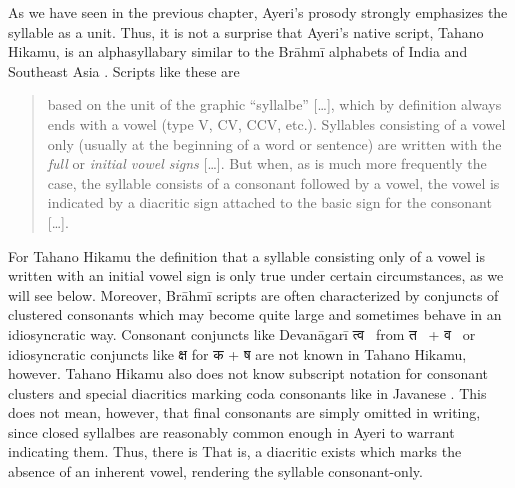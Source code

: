 As we have seen in the previous chapter, Ayeri's prosody strongly emphasizes 
the syllable as a unit. Thus, it is not a surprise that Ayeri's native script,
Tahano Hikamu, is an alphasyllabary similar to the Brāhmī alphabets of 
India and Southeast Asia \parencites{salomon1996}{court1996}. Scripts like these are 

\blockcquote[376]{salomon1996}{based on the unit of the graphic 
\enquote{syllalbe} […], which by definition always ends with a vowel (type V, 
CV, CCV, etc.). Syllables consisting of a vowel only (usually at the beginning 
of a word or sentence) are written with the \emph{full} or \emph{initial vowel 
signs} […]. But when, as is much more frequently the case, the syllable 
consists of a consonant followed by a vowel, the vowel is indicated by a 
diacritic sign attached to the basic sign for the consonant […].}

For Tahano Hikamu the definition that a syllable consisting only of a vowel is 
written with an initial vowel sign is only true under certain circumstances, as 
we will see below. Moreover, Brāhmī scripts are often characterized by 
conjuncts of clustered consonants which may become quite large and sometimes 
behave in an idiosyncratic way. Consonant conjuncts like Devanāgarī {\FS 
त्व}~ from {\FS त}~ + {\FS व}~ or idiosyncratic 
conjuncts like {\FS क्ष}  for {\FS क}  + {\FS ष}  
are not known in Tahano Hikamu, however. Tahano Hikamu also does not know 
subscript notation for consonant clusters and special diacritics marking coda 
consonants like in Javanese \citep[478--479]{kuipersmcdermott1996}. This does 
not mean, however, that final consonants are simply omitted in writing, since 
closed syllalbes are reasonably common enough in Ayeri to warrant indicating 
them. Thus, there is  That is, a diacritic exists which marks the absence 
of an inherent vowel, rendering the syllable consonant-only.

